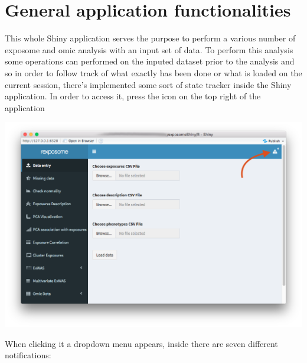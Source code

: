 \documentclass[
]{book}
\begin{document}
\hypertarget{general-application-functionalities}{%
\chapter{General application functionalities}\label{general-application-functionalities}}

This whole Shiny application serves the purpose to perform a various number of exposome and omic analysis with an input set of data. To perform this analysis some operations can performed on the inputed dataset prior to the analysis and so in order to follow track of what exactly has been done or what is loaded on the current session, there's implemented some sort of state tracker inside the Shiny application. In order to access it, press the icon on the top right of the application

\includegraphics{images/general1.png}

When clicking it a dropdown menu appears, inside there are seven different notifications:
\end{document}
